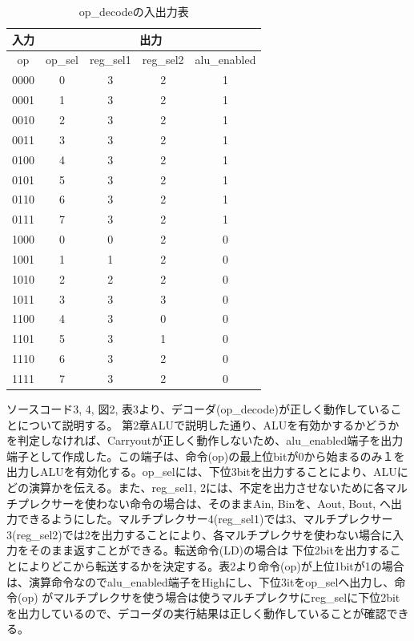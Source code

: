 \documentclass[12pt]{jreport}
\begin{document}
        \begin{table}[htb]
          \begin{center}
            \caption{op\_decodeの入出力表}
            \begin{tabular} {|c|c|c|c|c|} \hline
              入力 & \multicolumn{4}{|c|}{出力} \\ \hline \hline
                op & op\_sel & reg\_sel1 & reg\_sel2 & alu\_enabled \\ \hline
                0000 & 0 & 3 & 2 & 1 \\ \hline
                0001 & 1 & 3 & 2 & 1 \\ \hline
                0010 & 2 & 3 & 2 & 1 \\ \hline
                0011 & 3 & 3 & 2 & 1 \\ \hline

                0100 & 4 & 3 & 2 & 1 \\ \hline
                0101 & 5 & 3 & 2 & 1 \\ \hline
                0110 & 6 & 3 & 2 & 1 \\ \hline
                0111 & 7 & 3 & 2 & 1 \\ \hline

                1000 & 0 & 0 & 2 & 0 \\ \hline
                1001 & 1 & 1 & 2 & 0 \\ \hline
                1010 & 2 & 2 & 2 & 0 \\ \hline
                1011 & 3 & 3 & 3 & 0 \\ \hline

                1100 & 4 & 3 & 0 & 0 \\ \hline
                1101 & 5 & 3 & 1 & 0 \\ \hline
                1110 & 6 & 3 & 2 & 0 \\ \hline
                1111 & 7 & 3 & 2 & 0 \\ \hline

            \end{tabular}
          \end{center}
        \end{table}


        ソースコード3, 4, 図2, 表3より、デコーダ(op\_decode)が正しく動作していることについて説明する。
        第2章ALUで説明した通り、ALUを有効かするかどうかを判定しなければ、Carryoutが正しく動作しないため、alu\_enabled端子を出力端子として作成した。この端子は、命令(op)の最上位bitが0から始まるのみ１を出力しALUを有効化する。op\_selには、下位3bitを出力することにより、ALUにどの演算かを伝える。また、reg\_sel1, 2には、不定を出力させないために各マルチプレクサーを使わない命令の場合は、そのままAin, Binを、Aout, Bout, へ出力できるようにした。マルチプレクサー4(reg\_sel1)では3、マルチプレクサー3(reg\_sel2)では2を出力することにより、各マルチプレクサを使わない場合に入力をそのまま返すことができる。転送命令(LD)の場合は 下位2bitを出力することによりどこから転送するかを決定する。表2より命令(op)が上位1bitが1の場合は、演算命令なのでalu\_enabled端子をHighにし、下位3itをop\_selへ出力し、命令(op)
        がマルチプレクサを使う場合は使うマルチプレクサにreg\_selに下位2bitを出力しているので、デコーダの実行結果は正しく動作していることが確認できる。
\end{document}
